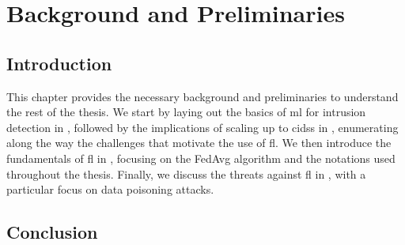 \chapter{Background and Preliminaries\label{chap:background}}
\localtoc


\section{Introduction\label{sec:bg.intro}}

This chapter provides the necessary background and preliminaries to understand the rest of the thesis. 
We start by laying out the basics of \gls{ml} for intrusion detection in , followed by the implications of scaling up to \glspl{cids} in , enumerating along the way the challenges that motivate the use of \gls{fl}.
We then introduce the fundamentals of \gls{fl} in , focusing on the FedAvg algorithm and the notations used throughout the thesis.
Finally, we discuss the threats against \gls{fl} in , with a particular focus on data poisoning attacks.






\section{Conclusion\label{sec:bg.conclusion}}



